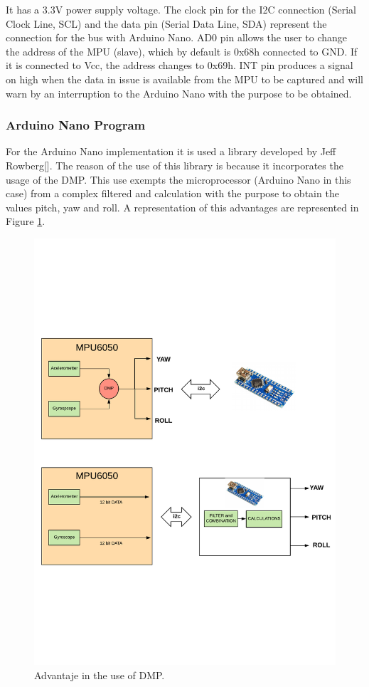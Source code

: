 It has a 3.3V power supply voltage. The clock pin for the I2C connection (Serial Clock Line, SCL) and the data pin (Serial Data Line, SDA) represent the connection for the bus with Arduino Nano. AD0 pin allows the user to change the address of the MPU (slave), which by default is 0x68h connected to GND. If it is connected to Vcc, the address changes to 0x69h. INT pin produces a signal on high when the data in issue is available from the MPU to be captured and will warn by an interruption to the Arduino Nano with the purpose to be obtained.\newline

\subsubsection{Arduino Nano Program}
For the Arduino Nano implementation it is used a library developed by Jeff Rowberg[]. The reason of the use of this library is because it incorporates the usage of the DMP. This use  exempts the microprocessor (Arduino Nano in this case) from a complex filtered and calculation with the purpose to obtain the values pitch, yaw and roll. A representation of this advantages are represented in Figure \ref{fig:DMPExample}.\newline
\begin{figure}[H]
	\center
	\includegraphics[trim = 0mm 4cm 0mm 2cm, clip,scale=0.6]{imagenes/Balancing_robot/DMPexample.pdf}
	\caption{Advantaje in the use of DMP.}
	\label{fig:DMPExample}
\end{figure} 


